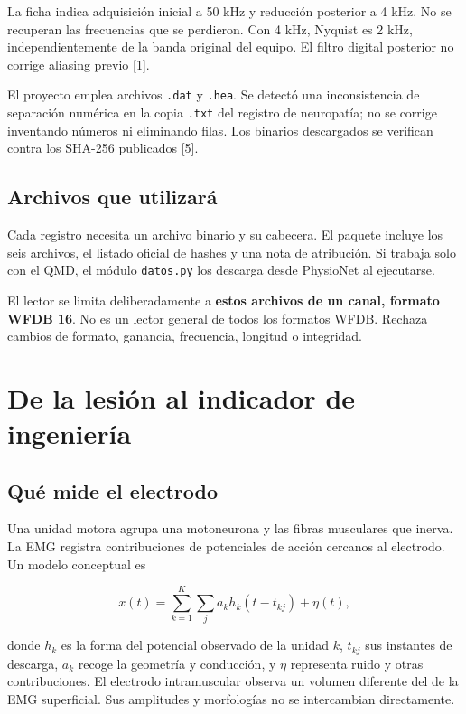 \documentclass[
  spanish,
  10.5pt,
  a4paper,
  DIV=11,
  numbers=noendperiod]{scrartcl}
\begin{document}
La ficha indica adquisición inicial a 50 kHz y reducción posterior a 4
kHz. No se recuperan las frecuencias que se perdieron. Con 4 kHz,
Nyquist es 2 kHz, independientemente de la banda original del equipo. El
filtro digital posterior no corrige aliasing previo {[}1{]}.

El proyecto emplea archivos \texttt{.dat} y \texttt{.hea}. Se detectó
una inconsistencia de separación numérica en la copia \texttt{.txt} del
registro de neuropatía; no se corrige inventando números ni eliminando
filas. Los binarios descargados se verifican contra los SHA-256
publicados {[}5{]}.

\subsection{Archivos que utilizará}\label{archivos-que-utilizaruxe1}

Cada registro necesita un archivo binario y su cabecera. El paquete
incluye los seis archivos, el listado oficial de hashes y una nota de
atribución. Si trabaja solo con el QMD, el módulo \texttt{datos.py} los
descarga desde PhysioNet al ejecutarse.

El lector se limita deliberadamente a \textbf{estos archivos de un
canal, formato WFDB 16}. No es un lector general de todos los formatos
WFDB. Rechaza cambios de formato, ganancia, frecuencia, longitud o
integridad.

\section{De la lesión al indicador de
ingeniería}\label{de-la-lesiuxf3n-al-indicador-de-ingenieruxeda}

\subsection{Qué mide el electrodo}\label{quuxe9-mide-el-electrodo}

Una unidad motora agrupa una motoneurona y las fibras musculares que
inerva. La EMG registra contribuciones de potenciales de acción cercanos
al electrodo. Un modelo conceptual es

\[x(t)=\sum_{k=1}^{K}\sum_j a_k h_k(t-t_{kj})+\eta(t),\]

donde \(h_k\) es la forma del potencial observado de la unidad \(k\),
\(t_{kj}\) sus instantes de descarga, \(a_k\) recoge la geometría y
conducción, y \(\eta\) representa ruido y otras contribuciones. El
electrodo intramuscular observa un volumen diferente del de la EMG
superficial. Sus amplitudes y morfologías no se intercambian
directamente.
\end{document}
